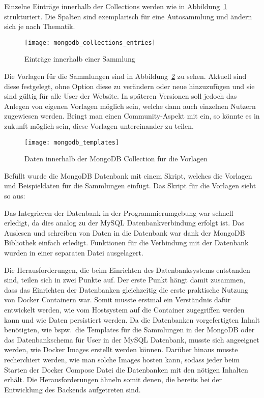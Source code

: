 Einzelne Einträge innerhalb der Collections werden wie in Abbildung~\ref{fig:mongodb_collections_entries} strukturiert.
Die Spalten sind exemplarisch für eine Autosammlung und ändern sich je nach Thematik.

\begin{figure}[h!]
    \centering
    \texttt{[image: mongodb\_collections\_entries]}
    \caption{Einträge innerhalb einer Sammlung}\label{fig:mongodb_collections_entries}
\end{figure}
\newpage

Die Vorlagen für die Sammlungen sind in Abbildung~\ref{fig:mongodb_templates} zu sehen.
Aktuell sind diese festgelegt, ohne Option diese zu verändern oder neue hinzuzufügen und sie sind gültig für alle User der Website.
In späteren Versionen soll jedoch das Anlegen von eigenen Vorlagen möglich sein, welche dann auch einzelnen Nutzern zugewiesen werden.
Bringt man einen Community-Aspekt mit ein, so könnte es in zukunft möglich sein, diese Vorlagen untereinander zu teilen.

\begin{figure}[h]
    \centering
    \texttt{[image: mongodb\_templates]}
    \caption{Daten innerhalb der MongoDB Collection für die Vorlagen}
    \label{fig:mongodb_templates}
\end{figure}
\newpage

Befüllt wurde die MongoDB Datenbank mit einem Skript, welches die Vorlagen und Beispieldaten für die Sammlungen einfügt.
Das Skript für die Vorlagen sieht so aus:

\vspace{1em}

\vspace{1em}

Das Integrieren der Datenbank in der Programmierumgebung war schnell erledigt, da dies analog zu der MySQL Datenbankverbindung erfolgt ist.
Das Auslesen und schreiben von Daten in die Datenbank war dank der MongoDB Bibliothek einfach erledigt.
Funktionen für die Verbindung mit der Datenbank wurden in einer separaten Datei ausgelagert.

Die Herausforderungen, die beim Einrichten des Datenbanksystems entstanden sind, teilen sich in zwei Punkte auf.
Der erste Punkt hängt damit zusammen, dass das Einrichten der Datenbanken gleichzeitig die erste praktische Nutzung von Docker Containern war.
Somit musste erstmal ein Verständnis dafür entwickelt werden, wie vom Hostsystem auf die Container zugegriffen werden kann und wie Daten persistiert werden.
Da die Datenbanken vorgefertigten Inhalt benötigten, wie bspw.\ die Templates für die Sammlungen in der MongoDB oder das Datenbankschema für User in der MySQL Datenbank, musste sich angeeignet werden, wie Docker Images erstellt werden können.
Darüber hinaus musste recherchiert werden, wie man solche Images hosten kann, sodass jeder beim Starten der Docker Compose Datei die Datenbanken mit den nötigen Inhalten erhält.
Die Herausforderungen ähneln somit denen, die bereits bei der Entwicklung des Backends aufgetreten sind.

